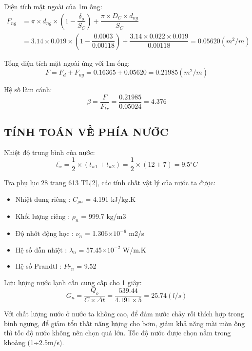 Diện tích mặt ngoài của 1m ống:
\begin{equation*}
	\begin{split}
		F_{ng} &= \pi\times d_{ng}\times\left(1 - \dfrac{\delta_{o}}{S_{C}}\right) + \dfrac{\pi\times D_{C}\times d_{ng}}{S_{C}} \\
		&= 3.14 \times 0.019 \times (1 - \dfrac{0.0003}{0.00118}) + \dfrac{3.14 \times 0.022 \times 0.019}{0.00118}= 0.05620(m^2/m)
	\end{split}
\end{equation*}

Tổng diện tích mặt ngoài ứng với 1m ống:
\begin{equation*}
	F = F_{d} + F_{ng} = 0.16365 + 0.05620 = 0.21985(m^2/m)
\end{equation*}

Hệ số làm cánh:
\begin{equation*}
	\beta = \dfrac{F}{F_{tr}} = \dfrac{0.21985}{0.05024}=4.376
\end{equation*}

\subsection{TÍNH TOÁN VỀ PHÍA NƯỚC}
Nhiệt độ trung bình của nước:
\begin{equation*}
	\overline{t_{w}} = \dfrac{1}{2}\times(t_{w1} + t_{w2}) = \dfrac{1}{2} \times (12+7)=9.5{^\circ}C
\end{equation*}

Tra phụ lục 28 trang 613 TL[2], các tính chất vật lý của nước ta được:
\begin{itemize}
	\item Nhiệt dung riêng : $C_{\rho n}$ = 4.191 kJ/kg.K
	\item Khối lượng riêng : $ \rho_{n} $ = 999.7 kg/m3
	\item Độ nhớt động học : $ \nu_{n} $ = 1.306$\times10^{-6}$ m2/s
	\item Hệ số dẫn nhiệt : $ \lambda_{n} $ = 57.45$\times10^{-2}$ W/m.K
	\item Hệ số Prandtl : $ Pr_{n} $ = 9.52
\end{itemize}

Lưu lượng nước lạnh cần cung cấp cho 1 giây:
\begin{equation*}
	G_{n} = \dfrac{Q_{o}}{C\times\Delta t} = \dfrac{539.44}{4.191 \times 5}=25.74(l/s)
\end{equation*}

Với chất lượng nước ở nước ta không cao, để đảm nước chảy rối thích hợp trong bình ngưng, để giảm tổn thất năng lượng cho bơm, giảm khả năng mài mòn ống thì tốc độ nước không nên chọn quá lớn. Tốc độ nước được chọn nằm trong khoảng (1$\div$2.5m/s).

